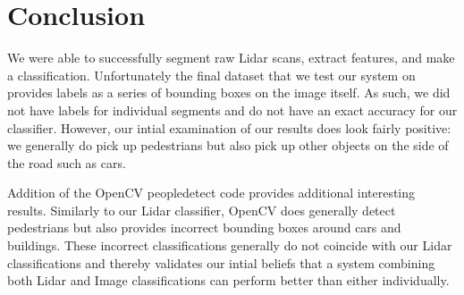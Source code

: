 \documentclass[10pt,twocolumn,letterpaper]{article}
\begin{document}
\section{Conclusion}
  We were able to successfully segment raw Lidar scans, extract
  features, and make a classification. Unfortunately the final dataset that
  we test our system on provides labels as a series of bounding boxes on the
  image itself. As such, we did not have labels for individual segments and do
  not have an exact accuracy for our classifier. However, our intial examination
  of our results does look fairly positive: we generally do pick up pedestrians
  but also pick up other objects on the side of the road such as cars.

  Addition of the OpenCV peopledetect code provides additional interesting
  results. Similarly to our Lidar classifier, OpenCV does generally detect
  pedestrians but also provides incorrect bounding boxes around cars and buildings.
  These incorrect classifications generally do not coincide with our Lidar
  classifications and thereby validates our intial beliefs that a system combining
  both Lidar and Image classifications can perform better than either individually.


{\small


}
\end{document}
